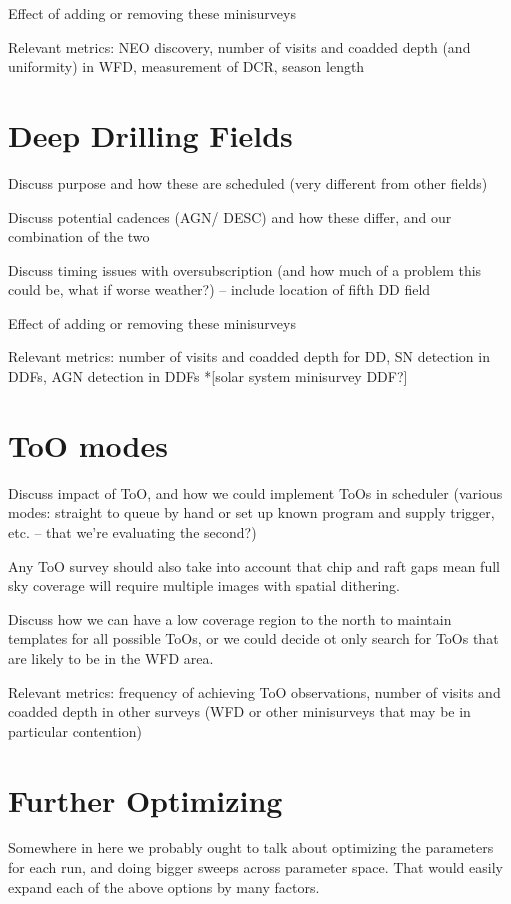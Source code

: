 Effect of adding or removing these minisurveys

Relevant metrics: NEO discovery, number of visits and coadded depth (and uniformity) in WFD, measurement of DCR, season length

\section{Deep Drilling Fields}
Discuss purpose and how these are scheduled (very different from other fields)

Discuss potential cadences (AGN/ DESC) and how these differ, and our combination of the two

Discuss timing issues with oversubscription (and how much of a problem this could be, what if worse weather?) -- include location of fifth DD field

Effect of adding or removing these minisurveys

Relevant metrics: number of visits and coadded depth for DD, SN detection in DDFs, AGN detection in DDFs
*[solar system minisurvey DDF?]

\section{ToO modes}
Discuss impact of ToO, and how we could implement ToOs in scheduler (various modes: straight to queue by hand or set up known program and supply trigger, etc. -- that we're evaluating the second?)

Any ToO survey should also take into account that chip and raft gaps mean full sky coverage will require multiple images with spatial dithering.

Discuss how we can have a low coverage region to the north to maintain templates for all possible ToOs, or we could decide ot only search for ToOs that are likely to be in the WFD area.

Relevant metrics: frequency of achieving ToO observations, number of visits and coadded depth in other surveys (WFD or other minisurveys that may be in particular contention)


\section{Further Optimizing}
Somewhere in here we probably ought to talk about optimizing the parameters for each run, and doing bigger sweeps across parameter space. That would easily expand each of the above options by many factors.

